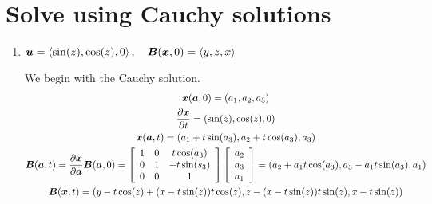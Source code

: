 \documentclass{article}
\begin{document}
\section{Solve using Cauchy solutions}
\begin{enumerate}
    \item $\boldsymbol{u} = \left< \sin(z), \cos(z), 0\right> , \quad \boldsymbol{B}(\boldsymbol{x},0) = \left< y,
    z, x\right>$
    
    We begin with the Cauchy solution. 
    \begin{gather*}
        \boldsymbol{x}(\boldsymbol{a}, 0) = \left(a_1, a_2, a_3\right)\\
        \frac{\partial \boldsymbol{x}}{\partial t} = \left(\sin(z), \cos(z), 0\right)\\
        \boldsymbol{x}(\boldsymbol{a},t) = \left(a_1 + t\sin(a_3), a_2 + t\cos(a_3), a_3\right)\\
        \boldsymbol{B}(\boldsymbol{a},t) = \frac{\partial \boldsymbol{x}}{\partial \boldsymbol{a}}\boldsymbol{B}(\boldsymbol{a},0)
        = \left[\begin{array}{c c c}
        1 & 0 & t\cos(a_3)\\
        0 & 1 & -t\sin(s_3)\\
        0 & 0 & 1\end{array}\right] \left[\begin{array}{c}
        a_2\\a_3\\a_1\end{array}\right] = \left(a_2 + a_1t\cos(a_3), a_3 -
        a_1t\sin(a_3), a_1\right)\\
        \boldsymbol{B}(\boldsymbol{x},t) = \left(y-t\cos(z) + (x-t\sin(z))t\cos(z), z -
        (x-t\sin(z))t\sin(z), x - t\sin(z)\right)
    \end{gather*}


\end{enumerate}
\end{document}
